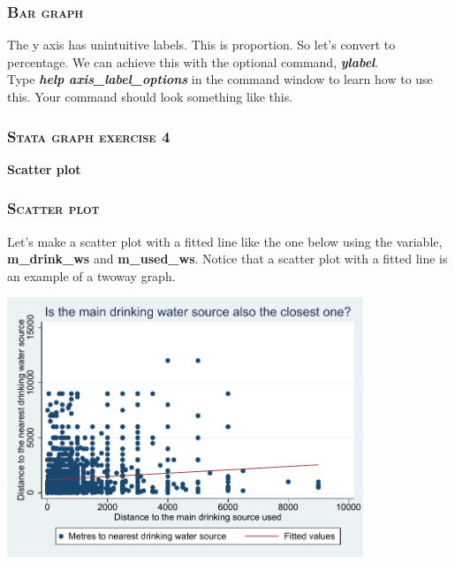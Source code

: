 \documentclass[10pt]{beamer}
\begin{document}
	\begin{frame}
	\frametitle{\textsc{Bar graph}}	
		 The y axis has unintuitive labels. This is proportion.
					 So let's convert to percentage. We can achieve this with 
					 the optional command, \textbf{\textit{ylabel}}. \\
		\vspace{1mm}			 
					 Type \textbf{\textit{help axis\_label\_options}} in the
					 command window to learn how to use this. 
		\vspace{1mm}
		\onslide<2-> Your command should look something like this. 
	
\begin{stlog}\end{stlog}
	\end{frame}
	
	\begin{frame}
	\frametitle{\textsc{Stata graph exercise 4}}
		\begin{center}
		\Large \textbf{Scatter plot}
		\end{center}
	\end{frame}		
	
	\begin{frame}
	\frametitle{\textsc{Scatter plot}}
		Let's make a scatter plot with a fitted line like the one below using the variable, \textbf{m\_drink\_ws} and \textbf{m\_used\_ws}.
		Notice that a scatter plot with a fitted line is an example of a twoway graph.
		\vspace{1mm}
	
\begin{center}
    \includegraphics[width=0.8\textwidth]{scatter_1.pdf}
\end{center}
	\end{frame}
	
\end{document}

